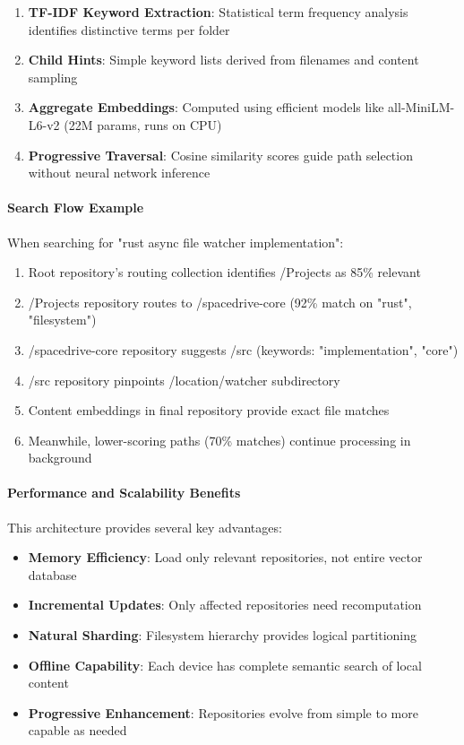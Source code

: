 \documentclass[sigconf]{acmart}
\begin{document}
\begin{enumerate}
    \item \textbf{TF-IDF Keyword Extraction}: Statistical term frequency analysis identifies distinctive terms per folder
    \item \textbf{Child Hints}: Simple keyword lists derived from filenames and content sampling
    \item \textbf{Aggregate Embeddings}: Computed using efficient models like all-MiniLM-L6-v2 (22M params, runs on CPU)
    \item \textbf{Progressive Traversal}: Cosine similarity scores guide path selection without neural network inference
\end{enumerate}

\paragraph{Search Flow Example}
When searching for "rust async file watcher implementation":

\begin{enumerate}
    \item Root repository's routing collection identifies /Projects as 85\% relevant
    \item /Projects repository routes to /spacedrive-core (92\% match on "rust", "filesystem")
    \item /spacedrive-core repository suggests /src (keywords: "implementation", "core")
    \item /src repository pinpoints /location/watcher subdirectory
    \item Content embeddings in final repository provide exact file matches
    \item Meanwhile, lower-scoring paths (70\% matches) continue processing in background
\end{enumerate}

\paragraph{Performance and Scalability Benefits}
This architecture provides several key advantages:

\begin{itemize}
    \item \textbf{Memory Efficiency}: Load only relevant repositories, not entire vector database
    \item \textbf{Incremental Updates}: Only affected repositories need recomputation
    \item \textbf{Natural Sharding}: Filesystem hierarchy provides logical partitioning
    \item \textbf{Offline Capability}: Each device has complete semantic search of local content
    \item \textbf{Progressive Enhancement}: Repositories evolve from simple to more capable as needed
\end{itemize}
\end{document}
